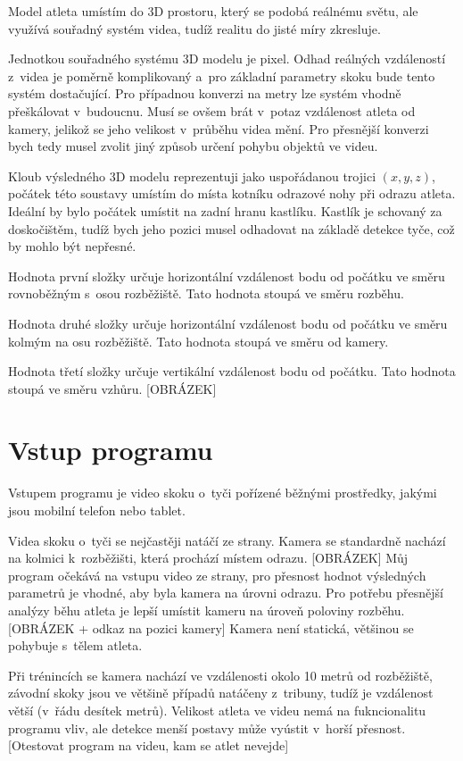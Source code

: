 Model atleta umístím do 3D prostoru, který se podobá reálnému světu, ale využívá souřadný systém videa, tudíž realitu do jisté míry zkresluje.

Jednotkou souřadného systému 3D modelu je pixel. Odhad reálných vzdáleností z~videa je poměrně komplikovaný a~pro základní parametry skoku bude tento systém dostačující. Pro případnou konverzi na metry lze systém vhodně přeškálovat v~budoucnu. Musí se ovšem brát v~potaz vzdálenost atleta od kamery, jelikož se jeho velikost v~průběhu videa mění. Pro přesnější konverzi bych tedy musel zvolit jiný způsob určení pohybu objektů ve videu.

Kloub výsledného 3D modelu reprezentuji jako uspořádanou trojici $(x,y,z)$, počátek této soustavy umístím do místa kotníku odrazové nohy při odrazu atleta. Ideální by bylo počátek umístit na zadní hranu kastlíku. Kastlík je schovaný za doskočištěm, tudíž bych jeho pozici musel odhadovat na základě detekce tyče, což by mohlo být nepřesné.

Hodnota první složky určuje horizontální vzdálenost bodu od počátku ve směru rovnoběžným s~osou rozběžiště. Tato hodnota stoupá ve směru rozběhu.

Hodnota druhé složky určuje horizontální vzdálenost bodu od počátku ve směru kolmým na osu rozběžiště. Tato hodnota stoupá ve směru od kamery.

Hodnota třetí složky určuje vertikální vzdálenost bodu od počátku. Tato hodnota stoupá ve směru vzhůru. [OBRÁZEK]




\section{Vstup programu}

Vstupem programu je video skoku o~tyči pořízené běžnými prostředky, jakými jsou mobilní telefon nebo tablet.

Videa skoku o~tyči se nejčastěji natáčí ze strany. Kamera se standardně nachází na kolmici k~rozběžišti, která prochází místem odrazu. [OBRÁZEK] Můj program očekává na vstupu video ze strany, pro přesnost hodnot výsledných parametrů je vhodné, aby byla kamera na úrovni odrazu. Pro potřebu přesnější analýzy běhu atleta je lepší umístit kameru na úroveň poloviny rozběhu. [OBRÁZEK + odkaz na pozici kamery] Kamera není statická, většinou se pohybuje s~tělem atleta.

Při trénincích se kamera nachází ve vzdálenosti okolo 10 metrů od rozběžiště, závodní skoky jsou ve většině případů natáčeny z~tribuny, tudíž je vzdálenost větší (v~řádu desítek metrů). Velikost atleta ve videu nemá na fukncionalitu programu vliv, ale detekce menší postavy může vyústit v~horší přesnost. [Otestovat program na videu, kam se atlet nevejde]




